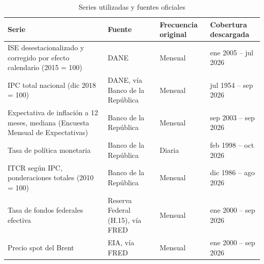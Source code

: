 \begin{table}[H]
\centering
\caption{Series utilizadas y fuentes oficiales}
\label{tab:fuentes}
\small
\begin{tabularx}{\textwidth}{@{}>{\raggedright\arraybackslash}X >{\raggedright\arraybackslash}p{3.4cm} >{\raggedright\arraybackslash}p{1.9cm} >{\raggedright\arraybackslash}p{3.0cm}@{}}
\toprule
Serie & Fuente & Frecuencia original & Cobertura descargada \\
\midrule
ISE desestacionalizado y corregido por efecto calendario (2015 = 100) & DANE & Mensual & ene 2005 -- jul 2026 \\
IPC total nacional (dic 2018 = 100) & DANE, vía Banco de la República & Mensual & jul 1954 -- sep 2026 \\
Expectativa de inflación a 12 meses, mediana (Encuesta Mensual de Expectativas) & Banco de la República & Mensual & sep 2003 -- sep 2026 \\
Tasa de política monetaria & Banco de la República & Diaria & feb 1998 -- oct 2026 \\
ITCR según IPC, ponderaciones totales (2010 = 100) & Banco de la República & Mensual & dic 1986 -- ago 2026 \\
Tasa de fondos federales efectiva & Reserva Federal (H.15), vía FRED & Mensual & ene 2000 -- sep 2026 \\
Precio spot del Brent & EIA, vía FRED & Mensual & ene 2000 -- sep 2026 \\
\bottomrule
\end{tabularx}
\end{table}
